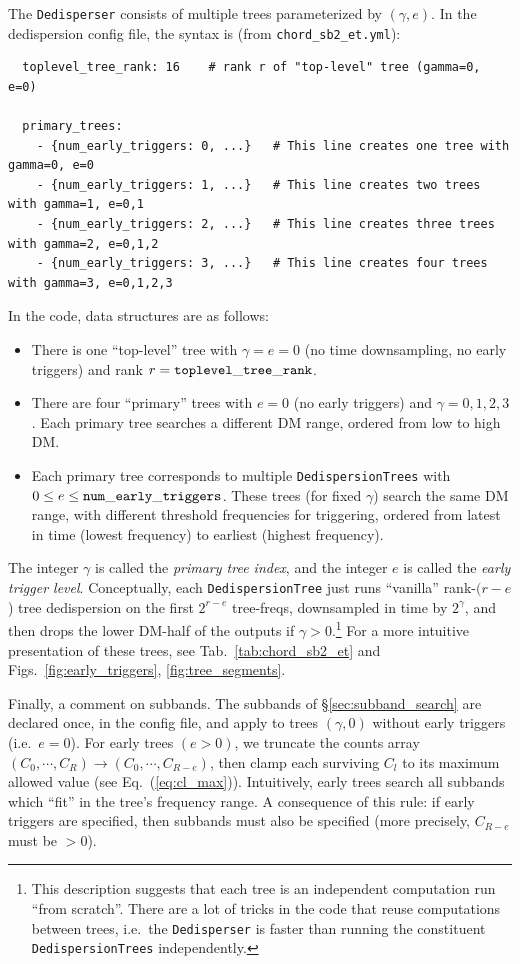 \documentclass{article}
\numberwithin{equation}{section}   %
\begin{document}
\par\noindent
The {\tt Dedisperser} consists of multiple trees parameterized by $(\gamma,e)$.
In the dedispersion config file, the syntax is (from {\tt chord\_sb2\_et.yml}):
\begin{verbatim}
  toplevel_tree_rank: 16    # rank r of "top-level" tree (gamma=0, e=0)

  primary_trees:
    - {num_early_triggers: 0, ...}   # This line creates one tree with gamma=0, e=0
    - {num_early_triggers: 1, ...}   # This line creates two trees with gamma=1, e=0,1
    - {num_early_triggers: 2, ...}   # This line creates three trees with gamma=2, e=0,1,2
    - {num_early_triggers: 3, ...}   # This line creates four trees with gamma=3, e=0,1,2,3
\end{verbatim}
In the code, data structures are as follows:
\begin{itemize}
\item There is one ``top-level'' tree with $\gamma=e=0$ (no time downsampling, no early triggers) and rank $r = {\tt toplevel\_tree\_rank}$.
\item There are four ``primary'' trees with $e=0$ (no early triggers) and $\gamma=0,1,2,3$.
Each primary tree searches a different DM range, ordered from low to high DM.
\item Each primary tree corresponds to multiple {\tt DedispersionTrees} with $0 \le e \le {\tt num\_early\_triggers}$.
These trees (for fixed $\gamma$) search the same DM range, with different threshold frequencies for triggering, ordered from latest in time (lowest frequency) to earliest (highest frequency).
\end{itemize}
The integer $\gamma$ is called the {\em primary tree index}, and the integer $e$ is called the {\em early trigger level}.
Conceptually, each {\tt DedispersionTree} just runs ``vanilla'' rank-$(r-e$) tree dedispersion on the first $2^{r-e}$ tree-freqs, downsampled in time by $2^\gamma$, and then drops the lower DM-half of the outputs if $\gamma > 0$.\footnote{This description suggests that each tree is an independent computation run ``from scratch''. There are a lot of tricks in the code that reuse computations between trees, i.e.\ the {\tt Dedisperser} is faster than running the constituent {\tt DedispersionTrees} independently.}
For a more intuitive presentation of these trees, see Tab.\ \ref{tab:chord_sb2_et} and Figs.\ \ref{fig:early_triggers}, \ref{fig:tree_segments}.

Finally, a comment on subbands.
The subbands of \S\ref{sec:subband_search} are declared once, in the config file, and apply to trees $(\gamma,0)$ without early triggers (i.e.\ $e=0$).
For early trees $(e > 0)$, we truncate the counts array $(C_0, \cdots, C_R) \rightarrow (C_0, \cdots, C_{R-e})$, then clamp each surviving $C_l$ to its
maximum allowed value (see Eq.\ (\ref{eq:cl_max})).
Intuitively, early trees search all subbands which ``fit'' in the tree's frequency range.
A consequence of this rule: if early triggers are specified, then subbands must also be specified (more precisely, $C_{R-e}$ must be $>0$).
\end{document}
